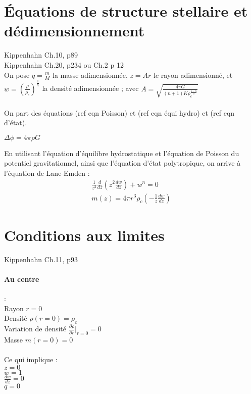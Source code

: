\documentclass[a4paper,10pt]{article}
\begin{document}
\newpage
\section{Équations de structure stellaire et dédimensionnement}
Kippenhahn Ch.10, p89\\
Kippenhahn Ch.20, p234 ou Ch.2 p 12\\


On pose $q=\frac{m}{M}$ la masse adimensionnée, $z=A r$ le rayon adimensionné, et $w=(\frac{\rho}{\rho_c})^{\frac{1}{n}}$ la densité adimensionnée ; avec $A=\sqrt{\frac{4 \pi G}{(n+1) K \rho_c^{\frac{1-n}{n}}}}$ \\
\\
On part des équations (ref eqn Poisson) et (ref eqn équi hydro) et (ref eqn d'état).\\

\begin{theorem}
$\Delta \phi = 4 \pi \rho G$
\end{theorem}


En utilisant l'équation d'équilibre hydrostatique et l'équation de Poisson du potentiel gravitationnel, ainsi que l'équation d'état polytropique, on arrive à l'équation de Lane-Emden :\\
\begin{eqnarray}
\frac{1}{z^2}\frac{d}{dz}(z^2 \frac{d w}{dz}) + w^n=0\\
m(z)=4 \pi r^3 \rho_c \left(- \frac{1}{z} \frac{dw}{dz}\right)
\end{eqnarray}

\newpage
\section{Conditions aux limites}
Kippenhahn Ch.11, p93
\paragraph{Au centre}: \\
Rayon $r=0$ \\
Densité $\rho (r=0) = \rho_c$ \\
Variation de densité $\frac{\partial \rho}{\partial r}\vert_{r=0} = 0$ \\
Masse $m(r=0)=0$ \\
\\
Ce qui implique : \\
$z=0$ \\
$w=1$ \\
$\frac{dw}{dz}=0$ \\
$q=0$
\end{document}
